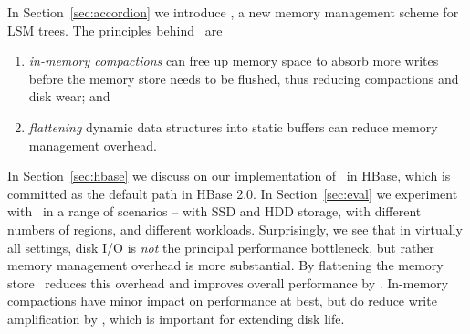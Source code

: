 In Section~\ref{sec:accordion}
we introduce \sys, a new memory management scheme for LSM trees.
The principles behind \sys\ are 
\begin{enumerate}
\item \emph{in-memory compactions} can free up memory space to absorb more writes before the
memory store needs to be flushed, thus reducing compactions and disk wear; and
\item \emph{flattening} dynamic data structures into static buffers can reduce memory management overhead.
\end{enumerate}

In Section~\ref{sec:hbase} we  discuss on our implementation of  \sys\ in HBase, which is committed  as the default path in HBase 2.0. 
In Section~\ref{sec:eval} we experiment with \sys\ in a range of  scenarios -- with SSD and HDD storage, with different numbers
of regions, and different workloads. Surprisingly, we see that in virtually all settings, disk I/O is \emph{not} the principal performance bottleneck,
but rather memory management overhead is more substantial. By flattening the memory store \sys\ reduces this overhead and improves overall performance by . In-memory compactions have minor impact on performance at best, but do reduce 
write amplification by , which is important for extending disk life.





